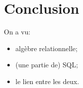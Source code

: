 \section{Conclusion}

On a vu:
\begin{itemize}
\item algèbre relationnelle;
\item (une partie de) SQL;
\item le lien entre les deux.
\end{itemize}

